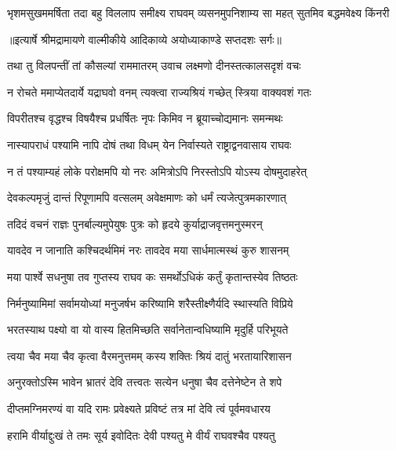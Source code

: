 \fourlineindentedshloka
{भृशमसुखममर्षिता तदा}
{बहु विललाप समीक्ष्य राघवम्}
{व्यसनमुपनिशाम्य सा महत्}
{सुतमिव बद्धमवेक्ष्य किंनरी} %


{॥इत्यार्षे श्रीमद्रामायणे वाल्मीकीये आदिकाव्ये अयोध्याकाण्डे सप्तदशः सर्गः॥}


\twolineshloka
{तथा तु विलपन्तीं तां कौसल्यां राममातरम्}
{उवाच लक्ष्मणो दीनस्तत्कालसदृशं वचः} %

\twolineshloka
{न रोचते ममाप्येतदार्ये यद्राघवो वनम्}
{त्यक्त्वा राज्यश्रियं गच्छेत् स्त्रिया वाक्यवशं गतः} %

\twolineshloka
{विपरीतश्च वृद्धश्च विषयैश्च प्रधर्षितः}
{नृपः किमिव न ब्रूयाच्चोद्यमानः समन्मथः} %

\twolineshloka
{नास्यापराधं पश्यामि नापि दोषं तथा विधम्}
{येन निर्वास्यते राष्ट्राद्वनवासाय राघवः} %

\twolineshloka
{न तं पश्याम्यहं लोके परोक्षमपि यो नरः}
{अमित्रोऽपि निरस्तोऽपि योऽस्य दोषमुदाहरेत्} %

\twolineshloka
{देवकल्पमृजुं दान्तं रिपूणामपि वत्सलम्}
{अवेक्षमाणः को धर्मं त्यजेत्पुत्रमकारणात्} %

\twolineshloka
{तदिदं वचनं राज्ञः पुनर्बाल्यमुपेयुषः}
{पुत्रः को हृदये कुर्याद्राजवृत्तमनुस्मरन्} %

\twolineshloka
{यावदेव न जानाति कश्चिदर्थमिमं नरः}
{तावदेव मया सार्धमात्मस्थं कुरु शासनम्} %

\twolineshloka
{मया पार्श्वे सधनुषा तव गुप्तस्य राघव}
{कः समर्थोऽधिकं कर्तुं कृतान्तस्येव तिष्ठतः} %

\twolineshloka
{निर्मनुष्यामिमां सर्वामयोध्यां मनुजर्षभ}
{करिष्यामि शरैस्तीक्ष्णैर्यदि स्थास्यति विप्रिये} %

\twolineshloka
{भरतस्याथ पक्ष्यो वा यो वास्य हितमिच्छति}
{सर्वानेतान्वधिष्यामि मृदुर्हि परिभूयते} %

\twolineshloka
{त्वया चैव मया चैव कृत्वा वैरमनुत्तमम्}
{कस्य शक्तिः श्रियं दातुं भरतायारिशासन} %

\twolineshloka
{अनुरक्तोऽस्मि भावेन भ्रातरं देवि तत्त्वतः}
{सत्येन धनुषा चैव दत्तेनेष्टेन ते शपे} %

\twolineshloka
{दीप्तमग्निमरण्यं वा यदि रामः प्रवेक्ष्यते}
{प्रविष्टं तत्र मां देवि त्वं पूर्वमवधारय} %

\twolineshloka
{हरामि वीर्याद्दुःखं ते तमः सूर्य इवोदितः}
{देवी पश्यतु मे वीर्यं राघवश्चैव पश्यतु} %

